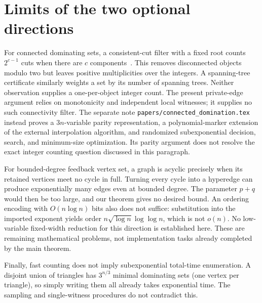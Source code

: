 \documentclass[11pt]{article}
\theoremstyle{remark}\newtheorem{remark}[theorem]{Remark}
\begin{document}
\section{Limits of the two optional directions}\label{sec:limits}
For connected dominating sets, a consistent-cut filter with a fixed root
counts $2^{c-1}$ cuts when there are $c$ components~\cite{cutcount}. This
removes disconnected objects modulo two but leaves positive multiplicities
over the integers. A spanning-tree certificate similarly weights a set by
its number of spanning trees. Neither observation supplies a one-per-object
integer count. The present private-edge argument relies on monotonicity and
independent local witnesses; it supplies no such connectivity filter.
The separate note \texttt{papers/connected\_domination.tex} instead proves a
$3n$-variable parity representation, a polynomial-marker extension of the
external interpolation algorithm, and randomized subexponential decision,
search, and minimum-size optimization. Its parity argument does not resolve
the exact integer counting question discussed in this paragraph.

For bounded-degree feedback vertex set, a graph is acyclic precisely when
its retained vertices meet no cycle in full. Turning every cycle into a
hyperedge can produce exponentially many edges even at bounded degree.
The parameter $p+q$ would then be too large, and our theorem gives no desired
bound. An ordering encoding with $O(n\log n)$ bits also does not suffice:
substitution into the imported exponent yields order
$n\sqrt{\log n}\log\log n$, which is not $o(n)$.
No low-variable fixed-width reduction for this direction is established here.
These are remaining mathematical problems, not implementation tasks already
completed by the main theorem.

Finally, fast counting does not imply subexponential total-time enumeration.
A disjoint union of triangles has $3^{n/3}$ minimal dominating sets (one
vertex per triangle), so simply writing them all already takes exponential
time. The sampling and single-witness procedures do not contradict this.
\end{document}
